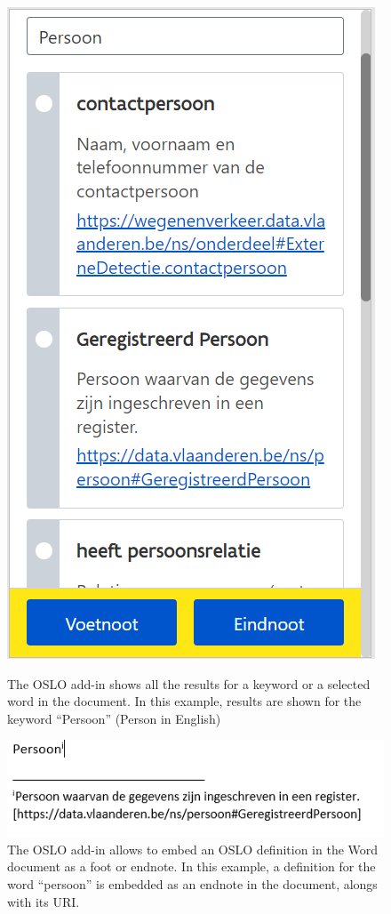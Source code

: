 \documentclass[manuscript]{acmart}
\begin{document}
\begin{figure}
\centering
\begin{minipage}{.5\textwidth}
  \centering
  \includegraphics[scale=.5]{images/oslo-add-in-1}
  \caption{The OSLO add-in shows all the results for a keyword or a selected word in the document. In this example, results are shown for the keyword ``Persoon'' (Person in English)}
  \label{oslo-add-in-1}
\end{minipage}%
\begin{minipage}{.5\textwidth}
  \centering
  \includegraphics[scale=.5]{images/oslo-add-in-2}
  \caption{The OSLO add-in allows to embed an OSLO definition in the Word document as a foot or endnote. In this example, a definition for the word ``persoon'' is embedded as an endnote in the document, alongs with its URI.}
  \label{oslo-add-in-2}
\end{minipage}
\end{figure}
\end{document}
